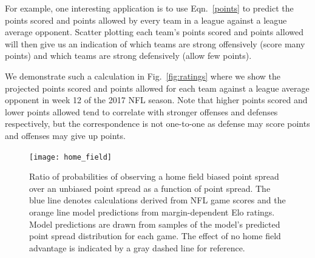 \documentclass[aps,prc,reprint,amsmath,superscriptaddress]{revtex4-1}
\begin{document}
For example, one interesting application is to use Eqn.~\eqref{points} to predict the points scored and points allowed by every team in a league against a league average opponent.
Scatter plotting each team's points scored and points allowed will then give us an indication of which teams are strong offensively (score many points) and which teams are strong defensively (allow few points).

We demonstrate such a calculation in Fig.~\ref{fig:ratings} where we show the projected points scored and points allowed for each team against a league average opponent in week 12 of the 2017 NFL season.
Note that higher points scored and lower points allowed tend to correlate with stronger offenses and defenses respectively, but the correspondence is not one-to-one as defense may score points and offenses may give up points.

\begin{figure}[b]
  \texttt{[image: home\_field]}
  \caption{Ratio of probabilities of observing a home field biased point spread over an unbiased point spread as a function of point spread. The blue line denotes calculations derived from NFL game scores and the orange line model predictions from margin-dependent Elo ratings. Model predictions are drawn from samples of the model's predicted point spread distribution for each game. The effect of no home field advantage is indicated by a gray dashed line for reference.}
  \label{fig:home_field}
\end{figure}
\end{document}
